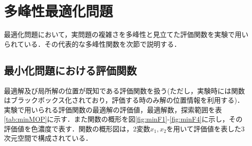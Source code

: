 \documentclass[a4j,11pt]{jarticle}
\begin{document}





\newpage
\section{多峰性最適化問題}
\label{sec:MOP}
最適化問題において，実問題の複雑さを多峰性と見立てた評価関数を実験で用いられている．その代表的な多峰性関数を次節で説明する．


\subsection{最小化問題における評価関数}
\label{ss:MinFunc}
最適解及び局所解の位置が既知である評価関数を扱う(ただし，実験時には関数はブラックボックス化されており，評価する時のみ解の位置情報を利用する)．
実験で用いられる評価関数の最適解の評価値，最適解数，探索範囲を表\ref{tab:minMOP}に示す．また関数の概形を図\ref{fig:minF1}-\ref{fig:minF4}に示し，その評価値を色濃度で表す．関数の概形図は，2変数$x_1, x_2$を用いて評価値を表した3次元空間で構成されている．
\end{document}
